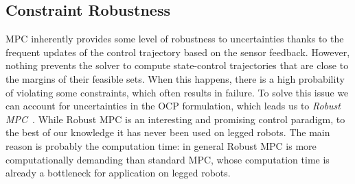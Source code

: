 \subsection{Constraint Robustness}
MPC inherently provides some level of robustness to uncertainties thanks to the frequent updates of the control trajectory based on the sensor feedback.
However, nothing prevents the solver to compute state-control trajectories that are close to the margins of their feasible sets.
When this happens, there is a high probability of violating some constraints, which often results in failure.
To solve this issue we can account for uncertainties in the OCP formulation, which leads us to \emph{Robust MPC}~\citep{Bemporad1999}.
While Robust MPC is an interesting and promising control paradigm, to the best of our knowledge it has never been used on legged robots.
The main reason is probably the computation time: in general Robust MPC is more computationally demanding than standard MPC, whose computation time is already a bottleneck for application on legged robots.

